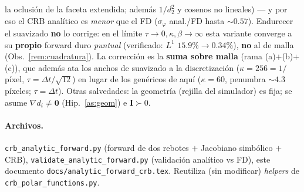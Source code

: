 \documentclass[11pt,a4paper]{article}
\theoremstyle{plain}
\theoremstyle{definition}
\newcommand{\vect}[1]{\boldsymbol{#1}}
\newcommand{\matr}[1]{\mathbf{#1}}
\begin{document}
la oclusi\'on de la faceta extendida; adem\'as $1/d_2^2$ y cosenos no lineales) ---
y por eso el CRB anal\'itico es \emph{menor} que el FD ($\sigma_\varphi$ anal./FD
hasta $\sim0.57$). Endurecer el suavizado \textbf{no} lo corrige: en el l\'imite
$\tau\to0,\kappa,\beta\to\infty$ esta variante converge a su \textbf{propio}
forward duro \emph{puntual} (verificado: $L^1$ $15.9\%\to0.34\%$), \textbf{no} al
de malla (Obs.~\ref{rem:cuadratura}). La correcci\'on es la \textbf{suma sobre
malla} (rama (a)+(b)+(c)), que adem\'as ata los anchos de suavizado a la
discretizaci\'on ($\kappa=256=1/$p\'ixel, $\tau=\Delta t/\sqrt{12}$) en lugar de
los gen\'ericos de aqu\'i ($\kappa=60$, penumbra $\sim4.3$ p\'ixeles;
$\tau=\Delta t$). Otras salvedades: la geometr\'ia (rejilla del simulador) es fija;
se asume $\nabla d_i\neq\vect0$ (Hip.~\ref{as:geom}) e $\matr{I}\succ0$.

\paragraph{Archivos.}
\texttt{crb\_analytic\_forward.py} (forward de dos rebotes $+$ Jacobiano
simb\'olico $+$ CRB), \texttt{validate\_analytic\_forward.py} (validaci\'on
anal\'itico vs FD), este documento \texttt{docs/analytic\_forward\_crb.tex}.
Reutiliza (sin modificar) \emph{helpers} de \texttt{crb\_polar\_functions.py}.
\end{document}
